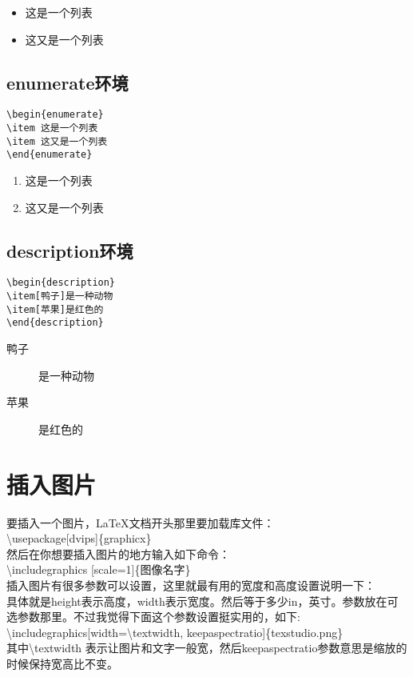 \begin{itemize}
\item 这是一个列表
\item 这又是一个列表
\end{itemize}

\subsection{enumerate环境}
\begin{verbatim}
\begin{enumerate}
\item 这是一个列表
\item 这又是一个列表
\end{enumerate}
\end{verbatim}

\begin{enumerate}
\item 这是一个列表
\item 这又是一个列表
\end{enumerate}

\subsection{description环境}
\begin{verbatim}
\begin{description}
\item[鸭子]是一种动物
\item[苹果]是红色的
\end{description}
\end{verbatim}

\begin{description}
\item[鸭子]是一种动物
\item[苹果]是红色的
\end{description}


\section{插入图片}
要插入一个图片，\LaTeX 文档开头那里要加载库文件：\\
\textbackslash usepackage[dvips]\{graphicx\}\\
然后在你想要插入图片的地方输入如下命令：\\
\textbackslash includegraphics [scale=1]\{图像名字\}\\
插入图片有很多参数可以设置，这里就最有用的宽度和高度设置说明一下：\\
具体就是height表示高度，width表示宽度。然后等于多少in，英寸。参数放在可选参数那里。不过我觉得下面这个参数设置挺实用的，如下:\\
\textbackslash includegraphics[width=\textbackslash textwidth, keepaspectratio]\{texstudio.png\}\\
其中\textbackslash textwidth 表示让图片和文字一般宽，然后keepaspectratio参数意思是缩放的时候保持宽高比不变。\\


